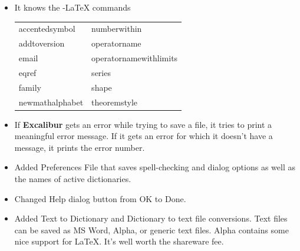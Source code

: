 ﻿\documentclass[11pt,titlepage]{article}
\newcommand{\ex}{\textbf{Excalibur}}
\newcommand{\AmS}{\latex{{\protect\the\textfont2
        A\kern-.1667em\lower.5ex\hbox{M}\kern-.125emS}}\html{AMS}}
\begin{document}
\begin{itemize}
\item It knows the \AmS-\LaTeX{} commands


  \begin{latexonly}
    \begin{tt}
      \begin{tabular}{ll}
        accentedsymbol  & numberwithin            \\
        addtoversion    & operatorname            \\
        email           & operatornamewithlimits  \\
        eqref           & series                  \\
        family          & shape                   \\
        newmathalphabet & theoremstyle
      \end{tabular}
    \end{tt}
  \end{latexonly}

\item If \ex{} gets an error while trying to save a file, it tries to
  print a meaningful error message. If it gets an error for which it
  doesn't have a message, it prints the error number.

\item Added Preferences File that saves spell-checking and dialog
  options as well as the names of active dictionaries.

\item Changed Help dialog button from OK to Done.

\item Added Text to Dictionary and Dictionary to text file
  conversions. Text files can be saved as MS Word, Alpha, or generic
  text files.  Alpha contains some nice support for \LaTeX.  It's well
  worth the shareware fee.
\end{itemize}
\end{document}
